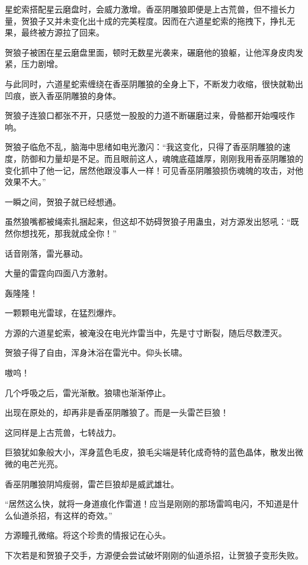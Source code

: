 
\begin{this_body}

星蛇索搭配星云磨盘时，会威力激增。香巫阴雕狼即便是上古荒兽，但不擅长力量，贺狼子又并未变化出十成的完美程度。因而在六道星蛇索的拖拽下，挣扎无果，最终被方源拉了回来。

贺狼子被困在星云磨盘里面，顿时无数星光袭来，碾磨他的狼躯，让他浑身皮肉发紧，压力剧增。

与此同时，六道星蛇索缠绕在香巫阴雕狼的全身上下，不断发力收缩，很快就勒出凹痕，嵌入香巫阴雕狼的身体。

贺狼子连狼口都张不开，只感觉一股股的力道不断碾磨过来，骨骼都开始嘎吱作响。

贺狼子临危不乱，脑海中思绪如电光激闪：“我这变化，只得了香巫阴雕狼的速度，防御和力量却是不足。而且眼前这人，魂魄底蕴雄厚，刚刚我用香巫阴雕狼的变化抓中了他一记，居然他跟没事人一样！可见香巫阴雕狼损伤魂魄的攻击，对他效果不大。”

一瞬之间，贺狼子就已经想通。

虽然狼嘴都被绳索扎捆起来，但这却不妨碍贺狼子用蛊虫，对方源发出怒吼：“既然你想找死，那我就成全你！”

话音刚落，雷光暴动。

大量的雷霆向四面八方激射。

轰隆隆！

一颗颗电光雷球，在猛烈爆炸。

方源的六道星蛇索，被淹没在电光炸雷当中，先是寸寸断裂，随后尽数湮灭。

贺狼子得了自由，浑身沐浴在雷光中。仰头长啸。

嗷呜！

几个呼吸之后，雷光渐散。狼啸也渐渐停止。

出现在原处的，却再非是香巫阴雕狼了。而是一头雷芒巨狼！

这同样是上古荒兽，七转战力。

巨狼犹如象般大小，浑身蓝色毛皮，狼毛尖端是转化成奇特的蓝色晶体，散发出微微的电芒光亮。

香巫阴雕狼阴鸠瘦弱，雷芒巨狼却是威武雄壮。

“居然这么快，就将一身道痕化作雷道！应当是刚刚的那场雷鸣电闪，不知道是什么仙道杀招，有这样的奇效。”

方源瞳孔微缩。将这个珍贵的情报记在心头。

下次若是和贺狼子交手，方源便会尝试破坏刚刚的仙道杀招，让贺狼子变形失败。


\end{this_body}
